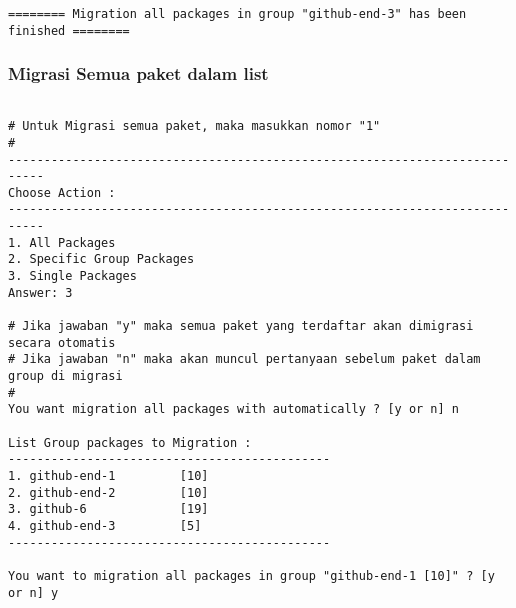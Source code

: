 {\begin{lstlisting}[language=ShellBash2]
======== Migration all packages in group "github-end-3" has been finished ========

\end{lstlisting}

\subsubsection{Migrasi Semua paket dalam list}

\begin{lstlisting}[language=ShellBash2]

# Untuk Migrasi semua paket, maka masukkan nomor "1"
#
---------------------------------------------------------------------------
Choose Action : 
---------------------------------------------------------------------------
1. All Packages
2. Specific Group Packages
3. Single Packages
Answer: 3

# Jika jawaban "y" maka semua paket yang terdaftar akan dimigrasi secara otomatis
# Jika jawaban "n" maka akan muncul pertanyaan sebelum paket dalam group di migrasi
# 
You want migration all packages with automatically ? [y or n] n

List Group packages to Migration : 
---------------------------------------------
1. github-end-1         [10]
2. github-end-2         [10]
3. github-6             [19]
4. github-end-3         [5]
---------------------------------------------

You want to migration all packages in group "github-end-1 [10]" ? [y or n] y


\end{lstlisting}}
